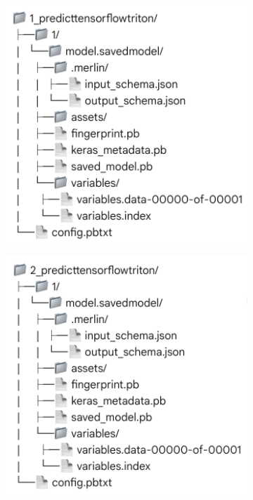 \begin{figure}[H]
\begin{subfigure}{.25\textwidth}
        \label{fig:Ensemble1}
    \end{subfigure}
    \begin{subfigure}{.3\textwidth}
        \centering
        \includegraphics[width=\textwidth]{assets/ensemble_2.png}
        \label{fig:Ensemble2}
    \end{subfigure}
    \bigskip
    \begin{subfigure}{.3\textwidth}
        \centering
        \includegraphics[width=\textwidth]{assets/ensemble_3.png}

\end{subfigure}
\end{figure}
